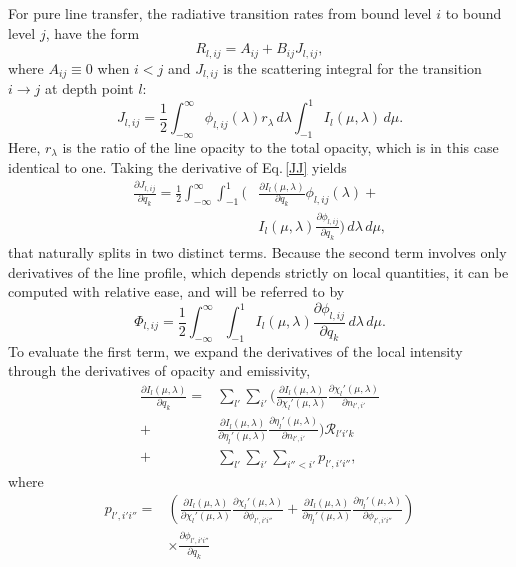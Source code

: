 \documentclass[referee]{aa}
\begin{document}
For pure line transfer, the radiative transition rates from bound level $i$ to bound level $j$, have the  form
\begin{equation}
 R_{l,ij} = A_{ij} + B_{ij} J_{l,ij},
\end{equation}
where $A_{ij} \equiv 0$ when $i<j$ and $J_{l,ij}$ is the  scattering integral for the transition $i\rightarrow j$ at depth point $l$:
\begin{equation}
 J_{l,ij} = \frac{1}{2} \int_{-\infty}^{\infty} \phi_{l,ij}(\lambda) r_{\lambda}\,d\lambda \int_{-1}^{1} I_l(\mu,\lambda)\,d\mu. 
 \label{JJ}
\end{equation}
Here, $r_{\lambda}$ is the ratio of the line opacity to the total opacity, which is in this case identical to one. Taking the derivative of Eq.\,\ref{JJ} yields
\begin{align}
 \frac{\partial J_{l,ij}}{\partial q_k} = \frac{1}{2} \int_{-\infty}^{\infty} \int_{-1}^{1} ( & \frac{\partial I_l(\mu,\lambda)}{\partial q_k} \phi_{l,ij}(\lambda) + \nonumber \\
 & I_l(\mu,\lambda) \frac{\partial \phi_{l,ij}}{\partial q_k} )\,d\lambda\,d\mu,
 \label{JJ2}
\end{align}
that naturally splits in two distinct terms. Because the second term involves only derivatives of the line profile, which depends strictly on local quantities, it can be computed with relative ease, and will be referred to by
\begin{equation}
\Phi_{l,ij} = \frac{1}{2} \int_{-\infty}^{\infty} \int_{-1}^{1} I_l(\mu,\lambda) \frac{\partial \phi_{l,ij}}{\partial q_k}\,d\lambda\,d\mu.
\end{equation}
To evaluate the first term, we expand the derivatives of the local intensity through the derivatives of opacity and emissivity,
\begin{align}
\frac{\partial I_l(\mu,\lambda)}{\partial q_k} = & \sum_{l'} \sum_{i'} ( \frac{\partial I_l(\mu,\lambda)}{\partial \chi_l'(\mu,\lambda)} \frac{\partial \chi_l'(\mu,\lambda)}{\partial n_{l',i'}} \nonumber \\
+& \frac{\partial I_l(\mu,\lambda)}{\partial \eta_l'(\mu,\lambda)} \frac{\partial \eta_l'(\mu,\lambda)}{\partial n_{l',i'}} ) {\mathcal R}_{l'i'k} \nonumber \\
+&  \sum_{l'} \sum_{i'} \sum_{i''<i'}  p_{l',i'i''},
\end{align}
where 
\begin{align}
 p_{l',i'i''} = &\left ( \frac{\partial I_l(\mu,\lambda)}{\partial \chi_l'(\mu,\lambda)} \frac{\partial \chi_l'(\mu,\lambda)}{\partial \phi_{l',i'i''}} + 
\frac{\partial I_l(\mu,\lambda)}{\partial \eta_l'(\mu,\lambda)} \frac{\partial \eta_l'(\mu,\lambda)}{\partial \phi_{l',i'i''}} \right )\nonumber \\
&\times \frac{\partial \phi_{l',i'i''}}{\partial q_k}
 \label{derI_inconcise}
\end{align}
\end{document}
